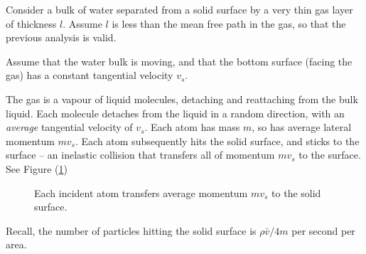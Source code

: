 \documentclass[12pt, a4paper, twoside, openright]{book}
\begin{document}
Consider a bulk of water separated from a solid surface by a very thin gas layer of thickness $l$.  Assume $l$ is less than the mean free path in the gas, so that the previous analysis is valid.

Assume that the water bulk is moving, and that the bottom surface (facing the gas) has a constant tangential velocity $v_{s}$.

The gas is a vapour of liquid molecules, detaching and reattaching from the bulk liquid.  Each molecule detaches from the liquid in a random direction, with an \emph{average} tangential velocity of $v_{s}$.  Each atom has mass $m$, so has average lateral momentum $mv_{s}$. Each atom subsequently hits the solid surface, and sticks to the surface  -- an inelastic collision that transfers all of momentum $mv_{s}$ to the surface. See Figure (\ref{atommomentum})


\begin{figure}[ht]
\centering
{}
\caption{Each incident atom transfers average momentum $mv_s$ to the solid surface.}\label{atommomentum}
\end{figure}

\vspace{1em}
Recall, the number of particles hitting the solid surface is $ \rho \bar{v} / 4 m$ per second per area.
\end{document}
